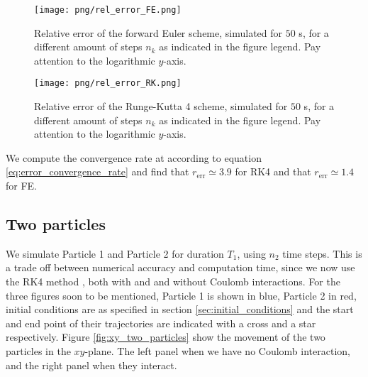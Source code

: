 \begin{figure}
    \texttt{[image: png/rel\_error\_FE.png]}
    \caption{Relative error of the forward Euler scheme, simulated for $50$ \textmu s, for a different amount of steps $n_k$ as indicated in the figure legend. Pay attention to the logarithmic $y$-axis.}
    \label{fig:error_FE}
\end{figure}


\begin{figure}
    \texttt{[image: png/rel\_error\_RK.png]}
    \caption{Relative error of the Runge-Kutta 4 scheme, simulated for $50$ \textmu s, for a different amount of steps $n_k$ as indicated in the figure legend. Pay attention to the logarithmic $y$-axis.}
    \label{fig:error_RK}
\end{figure}




We compute the convergence rate at according to equation \eqref{eq:error_convergence_rate} and find that $r_\mathrm{err}\simeq 3.9 $ for RK4 and that $r_\mathrm{err}\simeq 1.4 $ for FE. 


\subsection{Two particles}\label{sec:two_particles}

We simulate Particle 1 and Particle 2 for duration $T_1$,  using $n_2$ time steps. This is a trade off between numerical accuracy and computation time, since we now use the RK4 method , both with and and without Coulomb interactions. For the three figures soon to be mentioned, Particle 1 is shown in blue, Particle 2 in red, initial conditions are as specified in section \ref{sec:initial_conditions} and the start and end point of their trajectories are indicated with a cross and a star respectively. Figure \ref{fig:xy_two_particles} show the movement of the two particles in the $xy$-plane. The left panel when we have no Coulomb interaction, and the right panel when they interact. 

